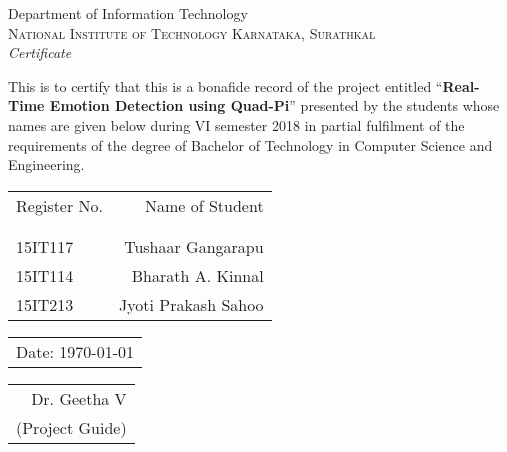 \newpage
\thispagestyle{empty}

\begin{center}

\huge{Department of Information Technology}\\[0.5cm]
\normalsize
\textsc{National Institute of Technology Karnataka, Surathkal}\\[2.0cm]

\emph{\LARGE Certificate}\\[2cm]
\end{center}
\normalsize This is to certify that this is a bonafide record of the project entitled ``\textbf{Real-Time Emotion Detection using Quad-Pi}'' presented by the students whose names are given below during VI semester 2018 in partial fulfilment of the requirements of the degree of Bachelor of Technology in Computer Science and Engineering.\\[1.0cm]

\begin{table}[h]
\centering
\bgroup
\def\arraystretch{1.2}
\begin{tabular}{lr}
Register No. & Name of Student \\ \\ \hline
\\
15IT117 & Tushaar Gangarapu \\ 
15IT114 & Bharath A. Kinnal \\
15IT213 & Jyoti Prakash Sahoo \\
\end{tabular}
\egroup
\end{table}

\vfill


\noindent
\begin{tabular}[t]{@{}l} 
\\
Date: \today
\end{tabular}
\hfill%
\begin{tabular}[t]{r@{}}
Dr. Geetha V \\
(Project Guide)
\end{tabular}
